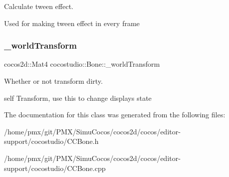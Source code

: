 Calculate tween effect. 

Used for making tween effect in every frame \mbox{\label{classcocostudio_1_1Bone_ad3682758971872de43af95ade37a4f89}} 
\subsubsection{\texorpdfstring{\+\_\+world\+Transform}{\_worldTransform}}
{\footnotesize\ttfamily cocos2d\+::\+Mat4 cocostudio\+::\+Bone\+::\+\_\+world\+Transform\hspace{0.3cm}{\ttfamily [protected]}}



Whether or not transform dirty. 

self Transform, use this to change display\textquotesingle{}s state 

The documentation for this class was generated from the following files\+:\begin{DoxyCompactItemize}
\item 
/home/pmx/git/\+P\+M\+X/\+Simu\+Cocos/cocos2d/cocos/editor-\/support/cocostudio/C\+C\+Bone.\+h\item 
/home/pmx/git/\+P\+M\+X/\+Simu\+Cocos/cocos2d/cocos/editor-\/support/cocostudio/C\+C\+Bone.\+cpp\end{DoxyCompactItemize}
